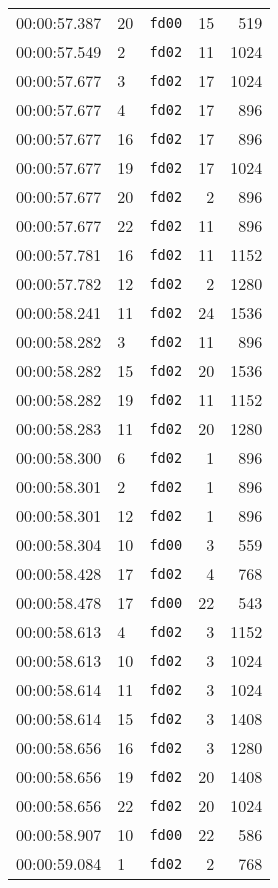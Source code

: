 \documentclass{article}
\begin{document}
\begin{longtable}{lllrr}
00:00:57.387 & 20 & \texttt{fd00} & 15 & 519 \\
00:00:57.549 & 2 & \texttt{fd02} & 11 & 1024 \\
00:00:57.677 & 3 & \texttt{fd02} & 17 & 1024 \\
00:00:57.677 & 4 & \texttt{fd02} & 17 & 896 \\
00:00:57.677 & 16 & \texttt{fd02} & 17 & 896 \\
00:00:57.677 & 19 & \texttt{fd02} & 17 & 1024 \\
00:00:57.677 & 20 & \texttt{fd02} & 2 & 896 \\
00:00:57.677 & 22 & \texttt{fd02} & 11 & 896 \\
00:00:57.781 & 16 & \texttt{fd02} & 11 & 1152 \\
00:00:57.782 & 12 & \texttt{fd02} & 2 & 1280 \\
00:00:58.241 & 11 & \texttt{fd02} & 24 & 1536 \\
00:00:58.282 & 3 & \texttt{fd02} & 11 & 896 \\
00:00:58.282 & 15 & \texttt{fd02} & 20 & 1536 \\
00:00:58.282 & 19 & \texttt{fd02} & 11 & 1152 \\
00:00:58.283 & 11 & \texttt{fd02} & 20 & 1280 \\
00:00:58.300 & 6 & \texttt{fd02} & 1 & 896 \\
00:00:58.301 & 2 & \texttt{fd02} & 1 & 896 \\
00:00:58.301 & 12 & \texttt{fd02} & 1 & 896 \\
00:00:58.304 & 10 & \texttt{fd00} & 3 & 559 \\
00:00:58.428 & 17 & \texttt{fd02} & 4 & 768 \\
00:00:58.478 & 17 & \texttt{fd00} & 22 & 543 \\
00:00:58.613 & 4 & \texttt{fd02} & 3 & 1152 \\
00:00:58.613 & 10 & \texttt{fd02} & 3 & 1024 \\
00:00:58.614 & 11 & \texttt{fd02} & 3 & 1024 \\
00:00:58.614 & 15 & \texttt{fd02} & 3 & 1408 \\
00:00:58.656 & 16 & \texttt{fd02} & 3 & 1280 \\
00:00:58.656 & 19 & \texttt{fd02} & 20 & 1408 \\
00:00:58.656 & 22 & \texttt{fd02} & 20 & 1024 \\
00:00:58.907 & 10 & \texttt{fd00} & 22 & 586 \\
00:00:59.084 & 1 & \texttt{fd02} & 2 & 768 \\

\end{longtable}
\end{document}
